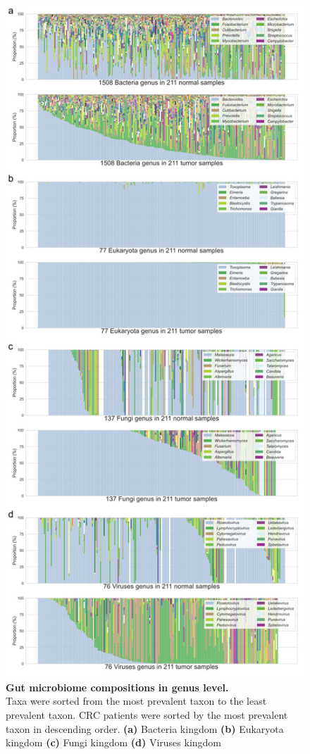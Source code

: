 \documentclass[11pt, a4paper, onecolumn, oneside]{report}
\begin{document}
            \begin{figure}[p]
                \centering
                \includegraphics[width=0.6 \linewidth]{Figures/CRC/Figure_01.png}
                \caption[Gut microbiome compositions in genus level]{\textbf{Gut microbiome compositions in genus level.}\\
                    Taxa were sorted from the most prevalent taxon to the least prevalent taxon. CRC patients were sorted by the most prevalent taxon in descending order. \textbf{(a)} Bacteria kingdom \textbf{(b)} Eukaryota kingdom \textbf{(c)} Fungi kingdom \textbf{(d)} Viruses kingdom}
                \label{fig:CRC-composition}
            \end{figure}
            \clearpage
\end{document}
